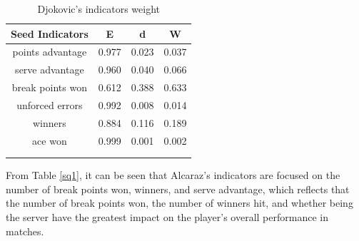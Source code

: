 \documentclass[12pt]{article}%
\begin{document}
\begin{center}
\begin{minipage}{0.9\textwidth}
\begin{minipage}[t]{0.52\textwidth}
\begin{table}[H]
		\end{table}
	\end{minipage}
	\begin{minipage}[t]{0.52\textwidth}
		\begin{table}[H]
			\centering
			\fontsize{9}{11}\selectfont
			\caption{Djokovic's indicators weight\label{sq2}}
			\begin{tabular}{cccc}
				\toprule[1.5pt]
				\rowcolor{yellow!50}
				Seed Indicators            & E                    & d                    & W                    \\
				\midrule[1pt]
				\rowcolor{yellow!30}
				\cellcolor{orange!40}	points advantage                
				& 0.977                & 0.023                & 0.037                \\
				\rowcolor{yellow!30}
				\cellcolor{orange!40}serve advantage
				& 0.960                & 0.040                & 0.066              \\
				\rowcolor{yellow!30}
				\cellcolor{orange!40}break points won
				& 0.612                & 0.388                & 0.633               \\
				\rowcolor{yellow!30}
				\cellcolor{orange!40}unforced errors
				& 0.992                & 0.008                & 0.014              \\
				\rowcolor{yellow!30}
				\cellcolor{orange!40}winners
				& 0.884                & 0.116                & 0.189               \\
				\rowcolor{yellow!30}
				\cellcolor{orange!40}ace won
				& 0.999                & 0.001                & 0.002              \\
				\bottomrule[1.5pt]
				\multicolumn{1}{l}{} & \multicolumn{1}{l}{} & \multicolumn{1}{l}{} & \multicolumn{1}{l}{} \\
				\multicolumn{1}{l}{} & \multicolumn{1}{l}{} & \multicolumn{1}{l}{} & \multicolumn{1}{l}{}
				\label{w}
			\end{tabular}
			\vspace{3pt}
		\end{table}
	\end{minipage}
\end{minipage}
\end{center}


From Table \ref{sq1}, it can be seen that Alcaraz's indicators are focused on the number of break points won, winners, and serve advantage, which reflects that the number of break points won, the number of winners hit, and whether being the server have the greatest impact on the player's overall performance in matches.
\end{document}
